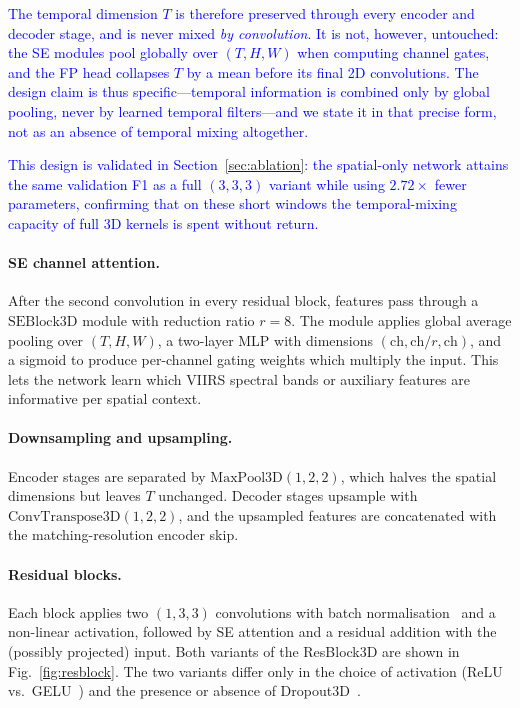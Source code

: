 \documentclass[sensors,article,submit,moreauthors,pdftex]{Definitions/mdpi}
\newcommand{\rev}[1]{\textcolor{blue}{#1}}
\begin{document}
\rev{The temporal dimension $T$ is therefore preserved through every encoder and decoder stage, and is never mixed \emph{by convolution}. It is not, however, untouched: the SE modules pool globally over $(T, H, W)$ when computing channel gates, and the FP head collapses $T$ by a mean before its final 2D convolutions. The design claim is thus specific---temporal information is combined only by global pooling, never by learned temporal filters---and we state it in that precise form, not as an absence of temporal mixing altogether.}

\rev{This design is validated in Section~\ref{sec:ablation}: the spatial-only
network attains the same validation F1 as a full $(3,3,3)$ variant while using
$2.72\times$ fewer parameters, confirming that on these short windows the
temporal-mixing capacity of full 3D kernels is spent without return.}

\paragraph*{SE channel attention.} After the second convolution in every residual block, features pass through a $\mathrm{SEBlock3D}$ module with reduction ratio $r = 8$. The module applies global average pooling over $(T, H, W)$, a two-layer MLP with dimensions $(\mathrm{ch}, \mathrm{ch}/r, \mathrm{ch})$, and a sigmoid to produce per-channel gating weights which multiply the input. This lets the network learn which VIIRS spectral bands or auxiliary features are informative per spatial context.

\paragraph*{Downsampling and upsampling.} Encoder stages are separated by $\mathrm{MaxPool3D}(1, 2, 2)$, which halves the spatial dimensions but leaves $T$ unchanged. Decoder stages upsample with $\mathrm{ConvTranspose3D}(1, 2, 2)$, and the upsampled features are concatenated with the matching-resolution encoder skip.

\paragraph*{Residual blocks.} Each block applies two $(1,3,3)$ convolutions with batch normalisation~\cite{ioffe2015batch} and a non-linear activation, followed by SE attention and a residual addition with the (possibly projected) input. Both variants of the ResBlock3D are shown in Fig.~\ref{fig:resblock}. The two variants differ only in the choice of activation (ReLU vs.\ GELU~\cite{hendrycks2016gaussian}) and the presence or absence of Dropout3D~\cite{srivastava2014dropout}.
\end{document}
